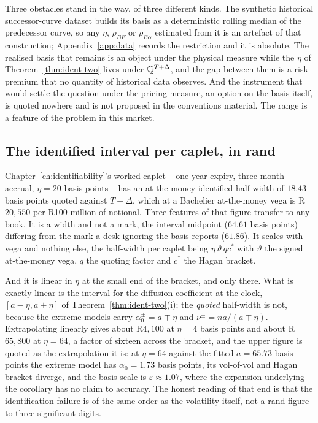 \documentclass[../../../main.tex]{subfiles}
\begin{document}
\begin{remark}\label{rem:zar-eta}
Three obstacles stand in the way, of three different kinds. The synthetic historical successor-curve dataset builds its basis as a deterministic rolling median of the predecessor curve, so any $\eta$, $\rho_{BF}$ or $\rho_{B\alpha}$ estimated from it is an artefact of that construction; Appendix~\ref{app:data} records the restriction and it is absolute. The realised basis that remains is an object under the physical measure while the $\eta$ of Theorem~\ref{thm:ident-two} lives under $\mathbb{Q}^{T+\Delta}$, and the gap between them is a risk premium that no quantity of historical data observes. And the instrument that would settle the question under the pricing measure, an option on the basis itself, is quoted nowhere and is not proposed in the conventions material. The range is a feature of the problem in this market.
\end{remark}

\subsection{The identified interval per caplet, in rand}

Chapter~\ref{ch:identifiability}'s worked caplet -- one-year expiry, three-month accrual, $\eta=20$ basis points -- has an at-the-money identified half-width of $18.43$ basis points quoted against $T+\Delta$, which at a Bachelier at-the-money vega is R$20{,}550$ per R100 million of notional. Three features of that figure transfer to any book. It is a width and not a mark, the interval midpoint ($64.61$ basis points) differing from the mark a desk ignoring the basis reports ($61.86$). It scales with vega and nothing else, the half-width per caplet being $\eta\,\vartheta\,qc^*$ with $\vartheta$ the signed at-the-money vega, $q$ the quoting factor and $c^*$ the Hagan bracket.

And it is linear in $\eta$ at the small end of the bracket, and only there. What is exactly linear is the interval for the diffusion coefficient at the clock, $[a-\eta,a+\eta]$ of Theorem~\ref{thm:ident-two}(i); the \emph{quoted} half-width is not, because the extreme models carry $\alpha_0^{\pm}=a\mp\eta$ and $\nu^{\pm}=na/(a\mp\eta)$. Extrapolating linearly gives about R$4{,}100$ at $\eta=4$ basis points and about R$65{,}800$ at $\eta=64$, a factor of sixteen across the bracket, and the upper figure is quoted as the extrapolation it is: at $\eta=64$ against the fitted $a=65.73$ basis points the extreme model has $\alpha_0=1.73$ basis points, its vol-of-vol and Hagan bracket diverge, and the basis scale is $\varepsilon\approx1.07$, where the expansion underlying the corollary has no claim to accuracy. The honest reading of that end is that the identification failure is of the same order as the volatility itself, not a rand figure to three significant digits.
\end{document}
